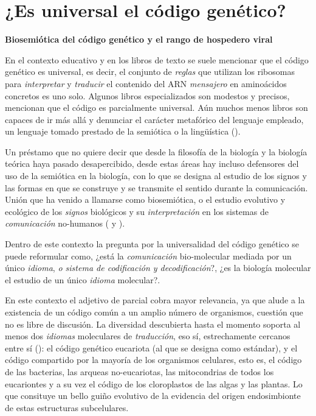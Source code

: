 \documentclass[
  12pt, krantz2,
  spanish,
]{krantz}
\begin{document}
\hypertarget{codigo}{%
\section{¿Es universal el código genético?}\label{codigo}}

\textbf{Biosemiótica del código genético y el rango de hospedero viral}

En el contexto educativo y en los libros de texto se suele mencionar que el código genético es universal, es decir, el conjunto de \emph{reglas} que utilizan los ribosomas para \emph{interpretar} y \emph{traducir} el contenido del ARN \emph{mensajero} en aminoácidos concretos es uno solo. Algunos libros especializados son modestos y precisos, mencionan que el código es parcialmente universal. Aún muchos menos libros son capaces de ir más allá y denunciar el carácter metafórico del lenguaje empleado, un lenguaje tomado prestado de la semiótica o la lingüística (\citet{urrezola2021signos}).

Un préstamo que no quiere decir que desde la filosofía de la biología y la biología teórica haya pasado desapercibido, desde estas áreas hay incluso defensores del uso de la semiótica en la biología, con lo que se designa al estudio de los signos y las formas en que se construye y se transmite el sentido durante la comunicación. Unión que ha venido a llamarse como biosemiótica, o el estudio evolutivo y ecológico de los \emph{signos} biológicos y su \emph{interpretación} en los sistemas de \emph{comunicación} no-humanos (\citet{urrezola2021signos} y \citet{romero29biosemiotica}).

Dentro de este contexto la pregunta por la universalidad del código genético se puede reformular como, ¿está la \emph{comunicación} bio-molecular mediada por un único \emph{idioma}, \emph{o sistema de codificación y decodificación}?, ¿es la biología molecular el estudio de un único \emph{idioma} molecular?.

En este contexto el adjetivo de parcial cobra mayor relevancia, ya que alude a la existencia de un código común a un amplio número de organismos, cuestión que no es libre de discusión. La diversidad descubierta hasta el momento soporta al menos dos \emph{idiomas} moleculares de \emph{traducción}, eso sí, estrechamente cercanos entre sí (\citet{schoch2020ncbi}): el código genético eucariota (al que se designa como estándar), y el código compartido por la mayoría de los organismos celulares, esto es, el código de las bacterias, las arqueas no-eucariotas, las mitocondrias de todos los eucariontes y a su vez el código de los cloroplastos de las algas y las plantas. Lo que consituye un bello guiño evolutivo de la evidencia del origen endosimbionte de estas estructuras subcelulares.
\end{document}
